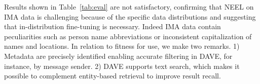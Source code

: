 


Results shown in Table~\ref{tab:eval} are not satisfactory, confirming that NEEL on IMA data is challenging because of the specific data distributions and suggesting that in-distribution fine-tuning is necessary. %
Indeed IMA data contain peculiarities such as person name abbreviations or inconsistent capitalization of names and locations. In relation to fitness for use, we make two remarks. 1) Metadata are precisely identified enabling accurate filtering in DAVE, for instance, by message sender. 2) DAVE supports text search, which makes it possible to complement entity-based retrieval to improve result recall.        


